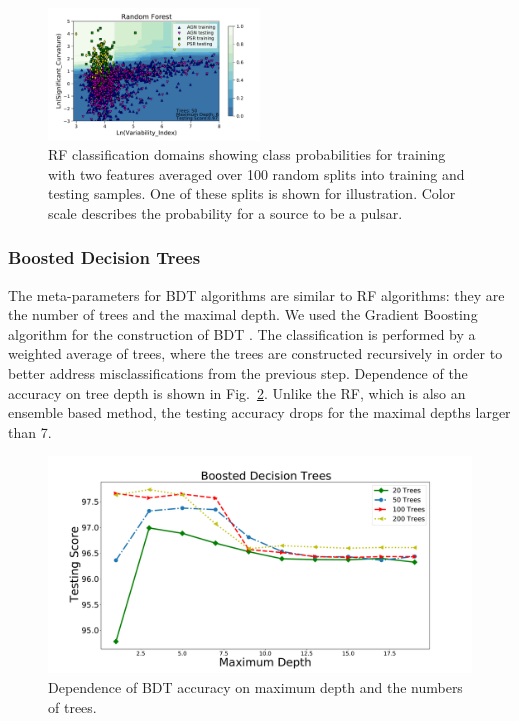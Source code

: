 \begin{figure}[h]
\centering
\includegraphics[width=0.5\textwidth]{plots/classification_domains/rf_50_6_final.pdf}
\caption{RF classification domains showing class probabilities for training with two features
averaged over 100 random splits into training and testing samples.
One of these splits is shown for illustration.
Color scale describes the probability for a source to be a pulsar.
}
\label{fig:RF_domains}
\end{figure}



\subsubsection{Boosted Decision Trees}

The meta-parameters for BDT algorithms are similar to RF algorithms: they are the number of trees and the maximal depth.
We used the Gradient Boosting algorithm for the construction of BDT \citep{gb}.
The classification is performed by a weighted average of trees, where the trees are constructed recursively in order to better address 
misclassifications from the previous step. 
Dependence of the accuracy on tree depth is shown in Fig.~\ref{fig:BDT_depth}. 
Unlike the RF, which is also an ensemble based method, the testing accuracy drops for the maximal depths larger than 7. 


\begin{figure}[h]
\centering
\includegraphics[width=\twopicsp\textwidth]{plots/bdt_train_assocnewfeats.pdf}
\caption{Dependence of BDT accuracy on maximum depth and the numbers of trees.}
\label{fig:BDT_depth}
\end{figure}

